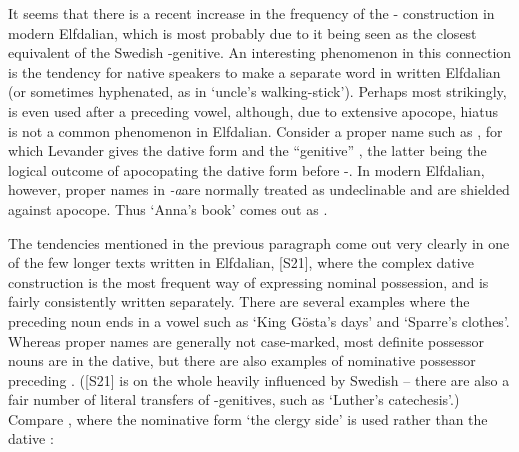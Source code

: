 {

It seems that there is a recent increase in the frequency of the \nobreakdash- construction in modern Elfdalian, which is most probably due to it being seen as the closest equivalent of the Swedish -genitive. An interesting phenomenon in this connection is the tendency for native speakers to make  a separate word in written Elfdalian (or sometimes hyphenated, as in  ‘uncle’s walking-stick’). Perhaps most strikingly,  is even used after a preceding vowel, although, due to extensive apocope, hiatus is not a common phenomenon in Elfdalian. Consider a proper name such as , for which Levander gives the dative form  and the “genitive” , the latter being the logical outcome of apocopating the dative form before {}-. In modern Elfdalian, however, proper names in\textit{ {}-a}\textstyleLinguisticExample{ }are normally treated as undeclinable and are shielded against apocope. Thus ‘Anna’s book’ comes out as . 

The tendencies mentioned in the previous paragraph come out very clearly in one of the few longer texts written in Elfdalian, [S21], where the complex dative construction is the most frequent way of expressing nominal possession, and  is fairly consistently written separately. There are several examples where the preceding noun ends in a vowel such as  ‘King Gösta’s days’ and  ‘Sparre’s clothes’. Whereas proper names are generally not case-marked, most definite possessor nouns are in the dative, but there are also examples of nominative possessor preceding . ([S21] is on the whole heavily influenced by Swedish – there are also a fair number of literal transfers of -genitives, such as ‘Luther’s catechesis’.) Compare , where the nominative form  ‘the clergy side’ is used rather than the dative :

}
